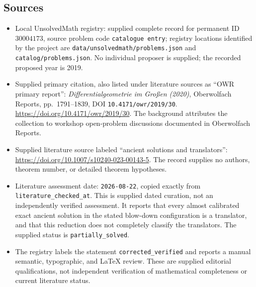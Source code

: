 \documentclass[11pt]{article}
\begin{document}
\subsection{Sources}
\begin{itemize}
\item Local UnsolvedMath registry: supplied complete record for permanent ID \(30004173\), source problem code \texttt{catalogue entry}; registry locations identified by the project are \texttt{data/unsolvedmath/problems.json} and \texttt{catalog/problems.json}. No individual proposer is supplied; the recorded proposed year is 2019.
\item Supplied primary citation, also listed under literature sources as ``OWR primary report'': \emph{Differentialgeometrie im Großen (2020)}, Oberwolfach Reports, pp.~1791--1839, DOI \texttt{10.4171/owr/2019/30}. \url{https://doi.org/10.4171/owr/2019/30}. The background attributes the collection to workshop open-problem discussions documented in Oberwolfach Reports.
\item Supplied literature source labeled ``ancient solutions and translators'': \url{https://doi.org/10.1007/s10240-023-00143-5}. The record supplies no authors, theorem number, or detailed theorem hypotheses.
\item Literature assessment date: \texttt{2026-08-22}, copied exactly from \texttt{literature\_checked\_at}. This is supplied dated curation, not an independently verified assessment. It reports that every almost calibrated exact ancient solution in the stated blow-down configuration is a translator, and that this reduction does not completely classify the translators. The supplied status is \texttt{partially\_solved}.
\item The registry labels the statement \texttt{corrected\_verified} and reports a manual semantic, typographic, and LaTeX review. These are supplied editorial qualifications, not independent verification of mathematical completeness or current literature status.
\end{itemize}
\end{document}
